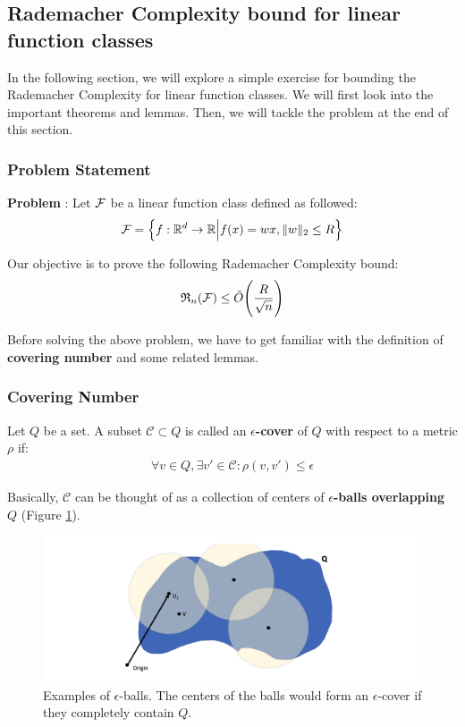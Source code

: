 \subsection{Rademacher Complexity bound for linear function classes}
In the following section, we will explore a simple exercise for bounding the Rademacher Complexity for linear function classes. We will first look into the important theorems and lemmas. Then, we will tackle the problem at the end of this section.

\subsubsection{Problem Statement}
\label{sec:rc_bound_lin_func_problem}

\textbf{Problem} : Let $\mathcal{F}$ be a linear function class defined as followed:
\begin{align*}
    \mathcal{F} = \Big\{ 
        f:\mathbb{R}^d \to \mathbb{R} \Big| f(x) = wx, \|w\|_2 \le R
     \Big\}
\end{align*}

\noindent Our objective is to prove the following Rademacher Complexity bound:
\begin{align*}
    \mathfrak{R}_n(\mathcal{F}) \le \tilde O \Bigg( 
        \frac{R}{\sqrt{n}}
     \Bigg)
\end{align*}

\noindent Before solving the above problem, we have to get familiar with the definition of \textbf{covering number} and some related lemmas.


\subsubsection{Covering Number}
\begin{definition}
    Let $Q$ be a set. A subset $\mathcal{C}\subset Q$ is called an \textbf{$\epsilon$-cover} of $Q$ with respect to a metric $\rho$ if:
    \begin{align*}
        \forall v \in Q, \exists v'\in \mathcal{C} : \rho(v, v') \le \epsilon
    \end{align*}

    \noindent Basically, $\mathcal{C}$ can be thought of as a collection of centers of \textbf{$\epsilon$-balls overlapping $Q$} (Figure \ref{fig:epsilon_cover}).
\end{definition}

\begin{figure}[ht]
    \centering
    \includegraphics[width=\textwidth]{figures/epsilon_cover.png}
    \caption{Examples of $\epsilon$-balls. The centers of the balls would form an $\epsilon$-cover if they completely contain $Q$.}
    \label{fig:epsilon_cover}
\end{figure}

